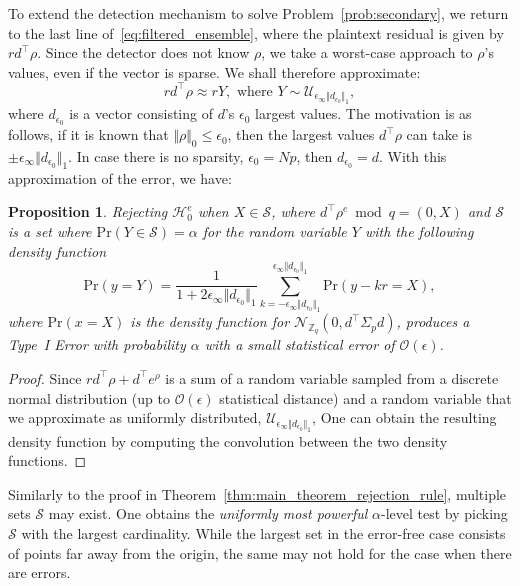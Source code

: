 \documentclass[journal, twoside, web]{ieeecolorpreprint}
\newtheorem{prop}{Proposition}
\begin{document}
To extend the detection mechanism to solve Problem~\ref{prob:secondary}, we return to the last line of~\eqref{eq:filtered_ensemble}, where the plaintext residual is given by $rd^\top \rho$. Since the detector does not know $\rho$, we take a worst-case approach to $\rho$'s values, even if the vector is sparse. We shall therefore approximate:
\begin{equation*}
    rd^\top \rho \approx r Y, \text{ where } Y\sim\mathcal{U}_{\epsilon_\infty \Vert d_{\epsilon_0} \Vert_1},
\end{equation*}
where $d_{\epsilon_0}$ is a vector consisting of $d$'s $\epsilon_0$ largest values. The motivation is as follows, if it is known that $\Vert \rho \Vert_0 \leq \epsilon_0$, then the largest values $d^\top \rho$ can take is $\pm \epsilon_\infty \Vert d_{\epsilon_0} \Vert_1$. In case there is no sparsity, $\epsilon_0 = Np$, then $d_{\epsilon_0}=d$. With this approximation of the error, we have:
\begin{prop}\label{prop:prop_rejection_rule}
    Rejecting $\mathcal{H}^e_0$ when $  X \in \mathcal{S}$, where $d^\top\rho^e \bmod q =(0,X)$ and $\mathcal{S}$ is a set where $\mathrm{Pr}(Y \in \mathcal{S})=\alpha$ for the random variable $Y$ with the following density function
    \begin{equation*}
        \mathrm{Pr}(y=Y) = \frac{1}{1+2 \epsilon_\infty \Vert d_{\epsilon_0} \Vert_1} \sum \limits_{k=-\epsilon_\infty \Vert d_{\epsilon_0} \Vert_1}^{\epsilon_\infty \Vert d_{\epsilon_0} \Vert_1} \mathrm{Pr}(y-kr=X),
    \end{equation*}
    where $\mathrm{Pr}(x=X)$ is the density function for $\mathcal{N}_{\mathbb{Z}_q}(0,d^\top \Sigma_p d)$, produces a Type~I Error with probability $\alpha$ with a small statistical error of $\mathcal{O}(\epsilon)$.
\end{prop}
\begin{proof}
    Since $r d^\top \rho + d^\top e^\rho$ is a sum of a random variable sampled from a discrete normal distribution (up to $\mathcal{O}(\epsilon)$ statistical distance) and a random variable that we approximate as uniformly distributed, $\mathcal{U}_{\epsilon_\infty \Vert d_{\epsilon_0} \Vert_1}$, One can obtain the resulting density function by computing the convolution between the two density functions. 
\end{proof}
Similarly to the proof in Theorem~\ref{thm:main_theorem_rejection_rule}, multiple sets $\mathcal{S}$ may exist. One obtains the \emph{uniformly most powerful} $\alpha$-level test by picking $\mathcal{S}$ with the largest cardinality. While the largest set in the error-free case consists of points far away from the origin, the same may not hold for the case when there are errors.
\end{document}
